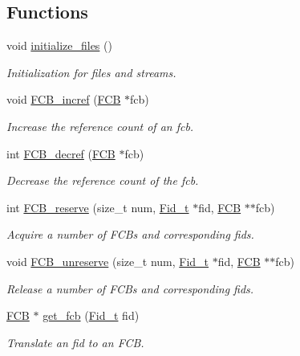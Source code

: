 \subsection*{Functions}
\begin{DoxyCompactItemize}
\item 
void \hyperlink{group__streams_ga147537248d983b0cc6cc7e8b39245f09}{initialize\-\_\-files} ()
\begin{DoxyCompactList}\small\item\em Initialization for files and streams. \end{DoxyCompactList}\item 
void \hyperlink{group__streams_ga409efca0b415dfdabe868c292d1daf66}{F\-C\-B\-\_\-incref} (\hyperlink{group__streams_ga0c7e751afb9d6cadebf070961804d400}{F\-C\-B} $\ast$fcb)
\begin{DoxyCompactList}\small\item\em Increase the reference count of an fcb. \end{DoxyCompactList}\item 
int \hyperlink{group__streams_ga26586eafc28dd1f2ac5bc7402922aa36}{F\-C\-B\-\_\-decref} (\hyperlink{group__streams_ga0c7e751afb9d6cadebf070961804d400}{F\-C\-B} $\ast$fcb)
\begin{DoxyCompactList}\small\item\em Decrease the reference count of the fcb. \end{DoxyCompactList}\item 
int \hyperlink{group__streams_ga462269376de145171b87b7bc3036e4f8}{F\-C\-B\-\_\-reserve} (size\-\_\-t num, \hyperlink{group__syscalls_ga5097222c5f0da97d92d4712359abc38f}{Fid\-\_\-t} $\ast$fid, \hyperlink{group__streams_ga0c7e751afb9d6cadebf070961804d400}{F\-C\-B} $\ast$$\ast$fcb)
\begin{DoxyCompactList}\small\item\em Acquire a number of F\-C\-Bs and corresponding fids. \end{DoxyCompactList}\item 
void \hyperlink{group__streams_gac44c094845a8d4e2e13f9df5b17274df}{F\-C\-B\-\_\-unreserve} (size\-\_\-t num, \hyperlink{group__syscalls_ga5097222c5f0da97d92d4712359abc38f}{Fid\-\_\-t} $\ast$fid, \hyperlink{group__streams_ga0c7e751afb9d6cadebf070961804d400}{F\-C\-B} $\ast$$\ast$fcb)
\begin{DoxyCompactList}\small\item\em Release a number of F\-C\-Bs and corresponding fids. \end{DoxyCompactList}\item 
\hyperlink{group__streams_ga0c7e751afb9d6cadebf070961804d400}{F\-C\-B} $\ast$ \hyperlink{group__streams_ga36b4f172aba29ba2660d0aed0f10d60b}{get\-\_\-fcb} (\hyperlink{group__syscalls_ga5097222c5f0da97d92d4712359abc38f}{Fid\-\_\-t} fid)
\begin{DoxyCompactList}\small\item\em Translate an fid to an F\-C\-B. \end{DoxyCompactList}\end{DoxyCompactItemize}


